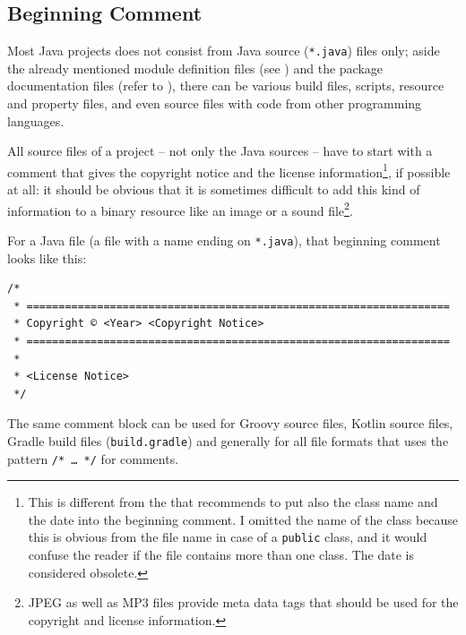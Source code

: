 \subsection{Beginning Comment}\label{sec:BeginningComment}
Most Java projects does not consist from Java source (\texttt{*.java}) files only; aside the already mentioned module definition files (see ) and the package documentation files (refer to ), there can be various build files, scripts, resource and property files, and even source files with code from other programming languages.

All source files of a project – not only the Java sources – have to start with a comment that gives the copyright notice and the license information\footnote{This is different from the  \autocite{SUN_CODE_CONVENTIONS:BeginningComments} that recommends to put also the class name and the date into the beginning comment. I omitted the name of the class because this is obvious from the file name in case of a \lstinline|public| class, and it would confuse the reader if the file contains more than one class. The date is considered obsolete.}, if possible at all: it should be obvious that it is sometimes difficult to add this kind of information to a binary resource like an image or a sound file\footnote{JPEG as well as MP3 files provide meta data tags that should be used for the copyright and license information.}.

For a Java file (a file with a name ending on \texttt{*.java}), that beginning comment looks like this:
\begin{lstlisting}[caption={Beginning Comment for a Java file}]
/*
 * ==================================================================
 * Copyright © <Year> <Copyright Notice>
 * ==================================================================
 *
 * <License Notice>
 */
\end{lstlisting}

The same comment block can be used for Groovy source files, Kotlin source files, Gradle build files (\texttt{build.gradle}) and generally for all file formats that uses the pattern \lstinline|/* … */| for comments.

